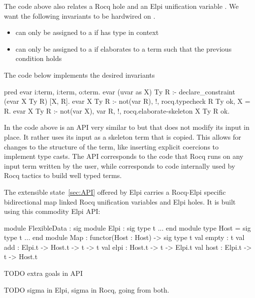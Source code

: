 \documentclass[a4paper, 11pt]{book}
\begin{document}
The code above also relates a Rocq hole  and an
Elpi unification variable . We want the following
invariants to be hardwired on .

\begin{itemize}
  \item {} can only be assigned to a  if
         has type  in context 
  \item {} can only be assigned to a  if
         elaborates to a term  such that
        the previous condition holds
\end{itemize}

The code below implements the desired invariants

\begin{elpicode}
pred evar i:term, i:term, o:term. %
evar (uvar as X) Ty R :- declare_constraint (evar X Ty R) [X, R].
evar X Ty R :- not(var R), !, rocq.typecheck R Ty ok, X = R.
evar X Ty R :- not(var X), var R, !, rocq.elaborate-skeleton X Ty R ok.
\end{elpicode}

In the code above  is an API
very similar to  but that does not modify
its input in place. It rather uses its input as a skeleton term that is
copied. This allows for changes to the structure of the term, like inserting
explicit coercions to implement type casts. The API corresponds to the code
that Rocq runs on any input term written by the user, while 
corresponds to code internally used by Rocq tactics to build well typed terms.

The extensible state~\ref{sec:API} offered by Elpi carries a Rocq-Elpi specific
bidirectional map linked Rocq unification variables and Elpi holes.
It is built using this commodity Elpi API:

\begin{ocamlcode}
module FlexibleData : sig
  module Elpi : sig type t ... end
  module type Host = sig type t ... end
  module Map : functor(Host : Host) -> sig
    type t
    val empty : t
    val add : Elpi.t -> Host.t -> t -> t
    val elpi   : Host.t -> t -> Elpi.t
    val host : Elpi.t -> t -> Host.t
\end{ocamlcode}

TODO extra goals in API

TODO sigma in Elpi, sigma in Rocq, going from both.
\end{document}
